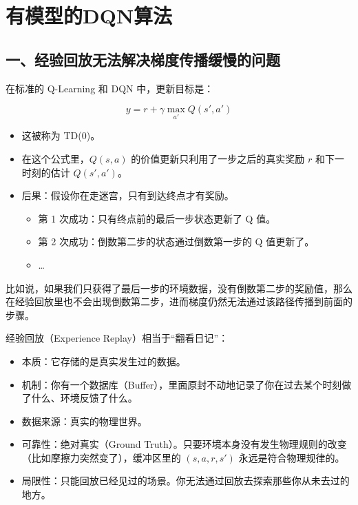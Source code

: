 \clearpage

\hypertarget{ux6709ux6a21ux578bux7684dqnux7b97ux6cd5}{%
\section{有模型的DQN算法}\label{ux6709ux6a21ux578bux7684dqnux7b97ux6cd5}}

\hypertarget{ux4e00ux7ecfux9a8cux56deux653eux65e0ux6cd5ux89e3ux51b3ux68afux5ea6ux4f20ux64adux7f13ux6162ux7684ux95eeux9898}{%
\subsection{一、经验回放无法解决梯度传播缓慢的问题}\label{ux4e00ux7ecfux9a8cux56deux653eux65e0ux6cd5ux89e3ux51b3ux68afux5ea6ux4f20ux64adux7f13ux6162ux7684ux95eeux9898}}

在标准的 Q-Learning 和 DQN 中，更新目标是：

\[
y=r+\gamma \max_{a'}Q(s',a')
\]

\begin{itemize}
\tightlist
\item
  这被称为 TD(0)。
\item
  在这个公式里，\(Q(s,a)\) 的价值更新只利用了一步之后的真实奖励 \(r\) 和下一时刻的估计 \(Q(s',a')\)。
\item
  后果：假设你在走迷宫，只有到达终点才有奖励。

  \begin{itemize}
  \tightlist
  \item
    第 1 次成功：只有终点前的最后一步状态更新了 Q 值。
  \item
    第 2 次成功：倒数第二步的状态通过倒数第一步的 Q 值更新了。
  \item
    \ldots{}
  \end{itemize}
\end{itemize}

比如说，如果我们只获得了最后一步的环境数据，没有倒数第二步的奖励值，那么在经验回放里也不会出现倒数第二步，进而梯度仍然无法通过该路径传播到前面的步骤。

经验回放（Experience Replay）相当于``翻看日记''：

\begin{itemize}
\tightlist
\item
  本质：它存储的是真实发生过的数据。
\item
  机制：你有一个数据库（Buffer），里面原封不动地记录了你在过去某个时刻做了什么、环境反馈了什么。
\item
  数据来源：真实的物理世界。
\item
  可靠性：绝对真实（Ground Truth）。只要环境本身没有发生物理规则的改变（比如摩擦力突然变了），缓冲区里的 \((s,a,r,s')\) 永远是符合物理规律的。
\item
  局限性：只能回放已经见过的场景。你无法通过回放去探索那些你从未去过的地方。
\end{itemize}

